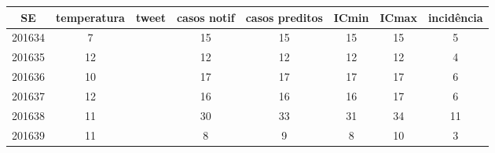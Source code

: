 \begin{tabular}{c|ccccccc}
  \hline
SE & temperatura & tweet & casos notif & casos preditos & ICmin & ICmax & incidência \\ 
  \hline
201634 & 7 &  & 15 & 15 & 15 & 15 & 5 \\ 
  201635 & 12 &  & 12 & 12 & 12 & 12 & 4 \\ 
  201636 & 10 &  & 17 & 17 & 17 & 17 & 6 \\ 
  201637 & 12 &  & 16 & 16 & 16 & 17 & 6 \\ 
  201638 & 11 &  & 30 & 33 & 31 & 34 & 11 \\ 
  201639 & 11 &  & 8 & 9 & 8 & 10 & 3 \\ 
   \hline
\end{tabular}
